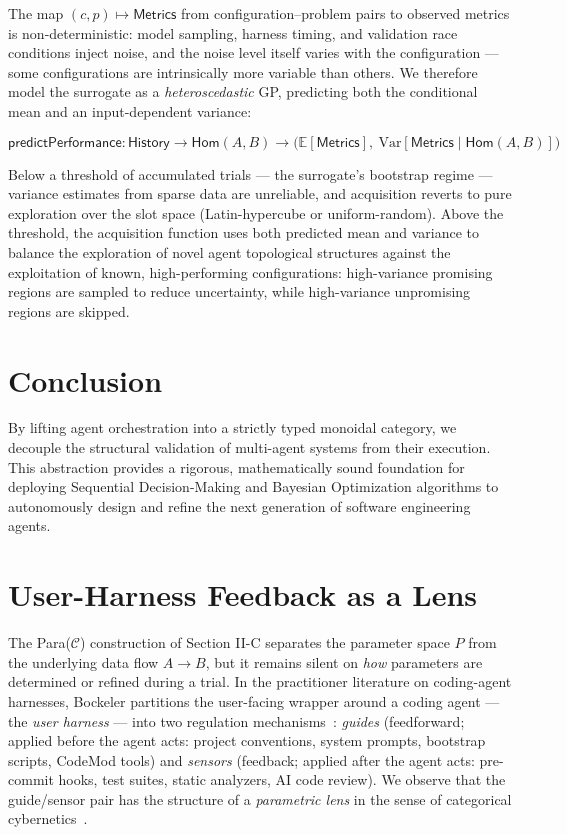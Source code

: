 \documentclass[journal]{IEEEtran}
\begin{document}
The map $(c, p) \mapsto \textsf{Metrics}$ from configuration--problem pairs to observed metrics is non-deterministic: model sampling, harness timing, and validation race conditions inject noise, and the noise level itself varies with the configuration --- some configurations are intrinsically more variable than others. We therefore model the surrogate as a \emph{heteroscedastic} GP, predicting both the conditional mean and an input-dependent variance:

\begin{equation}
\textsf{predictPerformance} : \textsf{History} \to \textsf{Hom}(A,B) \to \big(\mathbb{E}[\textsf{Metrics}],\ \mathrm{Var}[\textsf{Metrics} \mid \textsf{Hom}(A,B)]\big)
\end{equation}

Below a threshold of accumulated trials --- the surrogate's bootstrap regime --- variance estimates from sparse data are unreliable, and acquisition reverts to pure exploration over the slot space (Latin-hypercube or uniform-random). Above the threshold, the acquisition function uses both predicted mean and variance to balance the exploration of novel agent topological structures against the exploitation of known, high-performing configurations: high-variance promising regions are sampled to reduce uncertainty, while high-variance unpromising regions are skipped.

\section{Conclusion}
By lifting agent orchestration into a strictly typed monoidal category, we decouple the structural validation of multi-agent systems from their execution. This abstraction provides a rigorous, mathematically sound foundation for deploying Sequential Decision-Making and Bayesian Optimization algorithms to autonomously design and refine the next generation of software engineering agents.

\appendices

\section{User-Harness Feedback as a Lens}
\label{appendix:lens}

The Para($\mathcal{C}$) construction of Section II-C separates the parameter space $P$ from the underlying data flow $A \to B$, but it remains silent on \emph{how} parameters are determined or refined during a trial. In the practitioner literature on coding-agent harnesses, Bockeler partitions the user-facing wrapper around a coding agent --- the \textit{user harness} --- into two regulation mechanisms~\cite{bockeler2026}: \textit{guides} (feedforward; applied before the agent acts: project conventions, system prompts, bootstrap scripts, CodeMod tools) and \textit{sensors} (feedback; applied after the agent acts: pre-commit hooks, test suites, static analyzers, AI code review). We observe that the guide/sensor pair has the structure of a \textit{parametric lens} in the sense of categorical cybernetics~\cite{capucci2021}.
\end{document}
